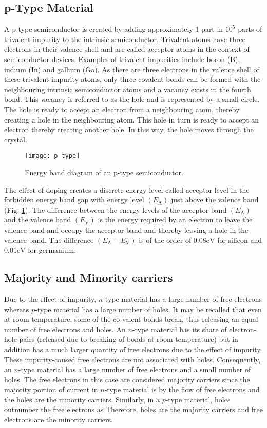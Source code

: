 \subsection{p-Type Material}
A p-type semiconductor is created by adding approximately 1 part in $10^{5}$ parts of trivalent impurity to the intrinsic semiconductor. Trivalent atoms have three electrons in their valence shell and are called acceptor atoms in the context of semiconductor devices. Examples of trivalent impurities include boron (B), indium (In) and gallium (Ga). As there are three electrons in the valence shell of these trivalent impurity atoms, only three covalent bonds can be formed with the neighbouring intrinsic semiconductor atoms and a vacancy exists in the fourth
bond. This vacancy is referred to as the hole and is represented by a small circle. The hole
is ready to accept an electron from a neighbouring atom, thereby creating a hole in the neighbouring atom. This hole in turn is ready to accept an electron thereby creating another hole. In this way, the hole moves through the crystal.
\begin{figure}[H]
	\centering
	\texttt{[image: p type]}
	\caption{Energy band diagram of an p-type
		semiconductor.}
	\label{p-type}
\end{figure}
The effect of doping creates a discrete energy level called acceptor level in the forbidden energy band gap with energy level $\left(E_{\mathrm{A}}\right)$ just above the valence band (Fig. \ref{p-type}). The difference between the energy levels of the acceptor band $\left(E_{\mathrm{A}}\right)$ and the valence band $\left(E_{\mathrm{V}}\right)$ is the energy required by an electron to leave the valence band and occupy the acceptor band and thereby leaving a hole in the valence band. The difference $\left(E_{\mathrm{A}}-E_{\mathrm{V}}\right)$ is of the order of $0.08 \mathrm{eV}$ for silicon and $0.01 \mathrm{eV}$ for germanium.
\subsection{Majority and Minority carriers}
Due to the effect of impurity, $n$-type material has a large number of free electrons whereas $p$-type material has a large number of holes. It may be recalled that even at room temperature, some of the co-valent bonds break, thus releasing an equal number of free electrons and holes. An $n$-type material has its share of electron-hole pairs (released due to breaking of bonds at room temperature) but in addition has a much larger quantity of free electrons due to the effect of impurity. These impurity-caused free electrons are not associated with holes. Consequently, an $n$-type material has a large number of free electrons and a small number of holes. The free electrons in this case are considered majority carriers  since the majority portion of current in $n$-type material is by the flow of free electrons  and the holes are the minority carriers. Similarly, in a $p$-type material, holes outnumber the free electrons as Therefore, holes are the majority carriers and free electrons are the minority carriers.
